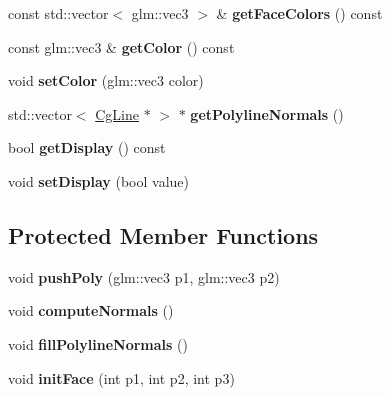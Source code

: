 \begin{DoxyCompactItemize}
\item 
\mbox{\label{class_cg_triangle_mesh_acb5ae0c84a1d8df49981d7cf2eff2db1}} 
const std\+::vector$<$ glm\+::vec3 $>$ \& {\bfseries get\+Face\+Colors} () const
\item 
\mbox{\label{class_cg_triangle_mesh_a588aa67aa9754e4fcd390e6d0d9dc066}} 
const glm\+::vec3 \& {\bfseries get\+Color} () const
\item 
\mbox{\label{class_cg_triangle_mesh_ad2a411f8df288e380025b8de3782d35b}} 
void {\bfseries set\+Color} (glm\+::vec3 color)
\item 
\mbox{\label{class_cg_triangle_mesh_acc1ca0ae3a6690680716e5cf7d76891d}} 
std\+::vector$<$ \hyperlink{class_cg_line}{Cg\+Line} $\ast$ $>$ $\ast$ {\bfseries get\+Polyline\+Normals} ()
\item 
\mbox{\label{class_cg_triangle_mesh_a6c9199348a11f4a3764d79b41b867e57}} 
bool {\bfseries get\+Display} () const
\item 
\mbox{\label{class_cg_triangle_mesh_a8013d7b3e5323ba79ffd527d698f350d}} 
void {\bfseries set\+Display} (bool value)
\end{DoxyCompactItemize}
\subsection*{Protected Member Functions}
\begin{DoxyCompactItemize}
\item 
\mbox{\label{class_cg_triangle_mesh_af27e19e76e08ff4ca35bfea9d376af81}} 
void {\bfseries push\+Poly} (glm\+::vec3 p1, glm\+::vec3 p2)
\item 
\mbox{\label{class_cg_triangle_mesh_a533564a1201660d1c76ffdfbdfe08520}} 
void {\bfseries compute\+Normals} ()
\item 
\mbox{\label{class_cg_triangle_mesh_a281acf9854665123c2a6209ac4aab665}} 
void {\bfseries fill\+Polyline\+Normals} ()
\item 
\mbox{\label{class_cg_triangle_mesh_a1657ba094f4747b6c2092d452bf2cb1b}} 
void {\bfseries init\+Face} (int p1, int p2, int p3)
\end{DoxyCompactItemize}
